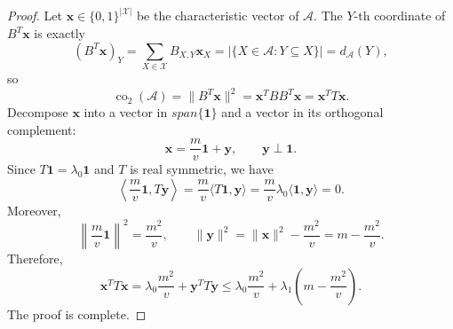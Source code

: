 \documentclass[10pt,a4paper]{amsart}
\newcommand{\co}{\operatorname{co}_2}
\begin{document}
\begin{proof}
Let $\bm{x}\in\{0,1\}^{|\mathscr{X}|}$ be the characteristic vector of $\mathcal A$.  The $Y$-th coordinate of $B^T\bm{x}$ is exactly
\[
(B^T\bm{x})_Y=\sum_{X\in \mathscr{X}}B_{X,Y}\bm{x}_X=|\{X\in\mathcal A:Y\subseteq X\}|=d_{\mathcal A}(Y),
\]
so
\[
\co(\mathcal A)=\|B^T\bm{x}\|^2=\bm{x}^TBB^T\bm{x}=\bm{x}^TT\bm{x}.
\]
Decompose $\bm{x}$ into a vector in $span\{\mathbf{1}\}$ and a vector in its orthogonal complement:
\[
\bm{x}=\frac{m}{v}\mathbf 1+\bm{y},
\qquad \bm{y}\perp \mathbf 1.
\]
Since $T\mathbf 1=\lambda_0\mathbf 1$ and $T$ is real symmetric, we have
\[
\left\langle \frac{m}{v}\mathbf 1,T\bm{y}\right\rangle
=\frac{m}{v}\langle T\mathbf 1,\bm{y}\rangle
=\frac{m}{v}\lambda_0\langle \mathbf 1,\bm{y}\rangle=0.
\]
Moreover,
\[
\left\|\frac{m}{v}\mathbf 1\right\|^2=\frac{m^2}{v},
\qquad
\|\bm{y}\|^2=\|\bm{x}\|^2-\frac{m^2}{v}=m-\frac{m^2}{v}.
\]
Therefore,
\[
\bm{x}^TT\bm{x}=\lambda_0\frac{m^2}{v}+\bm{y}^TT\bm{y}
\le \lambda_0\frac{m^2}{v}+\lambda_1\left(m-\frac{m^2}{v}\right).
\]
The proof is complete.
\end{proof}
\end{document}
